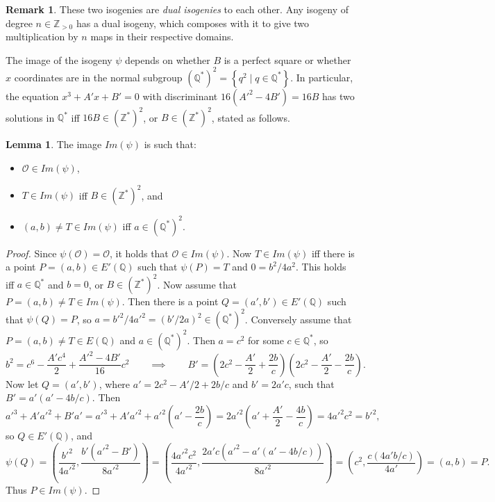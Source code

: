\documentclass{article}
\newcommand{\Z}{\mathbb{Z}}
\newcommand{\Q}{\mathbb{Q}}
\newcommand{\rb}[1]{\left( #1 \right)}
\newcommand{\cb}[1]{\left\{ #1 \right\}}
\theoremstyle{definition}
\newtheorem*{remark}{Remark}
\newtheorem{lemma}[proposition]{Lemma}
\begin{document}
\begin{remark}
These two isogenies are \emph{dual isogenies} to each other. Any isogeny of degree $ n \in \Z_{> 0} $ has a dual isogeny, which composes with it to give two multiplication by $ n $ maps in their respective domains.
\end{remark}

\pagebreak

The image of the isogeny $ \psi $ depends on whether $ B $ is a perfect square or whether $ x $ coordinates are in the normal subgroup $ \rb{\Q^*}^2 = \cb{q^2 \mid q \in \Q^*} $. In particular, the equation $ x^3 + A'x + B' = 0 $ with discriminant $ 16\rb{A'^2 - 4B'} = 16B $ has two solutions in $ \Q^* $ iff $ 16B \in \rb{\Z^*}^2 $, or $ B \in \rb{\Z^*}^2 $, stated as follows.

\begin{lemma}
The image $ Im\rb{\psi} $ is such that:
\begin{itemize}
\item $ \mathcal{O} \in Im\rb{\psi} $,
\item $ T \in Im\rb{\psi} $ iff $ B \in \rb{\Z^*}^2 $, and
\item $ \rb{a, b} \ne T \in Im\rb{\psi} $ iff $ a \in \rb{\Q^*}^2 $.
\end{itemize}
\end{lemma}

\begin{proof}
Since $ \psi\rb{\mathcal{O}} = \mathcal{O} $, it holds that $ \mathcal{O} \in Im\rb{\psi} $. Now $ T \in Im\rb{\psi} $ iff there is a point $ P = \rb{a, b} \in E'\rb{\Q} $ such that $ \psi\rb{P} = T $ and $ 0 = b^2 / 4a^2 $. This holds iff $ a \in \Q^* $ and $ b = 0 $, or $ B \in \rb{\Z^*}^2 $. Now assume that $ P = \rb{a, b} \ne T \in Im\rb{\psi} $. Then there is a point $ Q = \rb{a', b'} \in E'\rb{\Q} $ such that $ \psi\rb{Q} = P $, so $ a = b'^2 / 4a'^2 = \rb{b' / 2a}^2 \in \rb{\Q^*}^2 $. Conversely assume that $ P = \rb{a, b} \ne T \in E\rb{\Q} $ and $ a \in \rb{\Q^*}^2 $. Then $ a = c^2 $ for some $ c \in \Q^* $, so
$$ b^2 = c^6 - \dfrac{A'c^4}{2} + \dfrac{A'^2 - 4B'}{16}c^2 \qquad \implies \qquad B' = \rb{2c^2 - \dfrac{A'}{2} + \dfrac{2b}{c}}\rb{2c^2 - \dfrac{A'}{2} - \dfrac{2b}{c}}. $$
Now let $ Q = \rb{a', b'} $, where $ a' = 2c^2 - A' / 2 + 2b / c $ and $ b' = 2a'c $, such that $ B' = a'\rb{a' - 4b / c} $. Then
$$ a'^3 + A'a'^2 + B'a' = a'^3 + A'a'^2 + a'^2\rb{a' - \dfrac{2b}{c}} = 2a'^2\rb{a' + \dfrac{A'}{2} - \dfrac{4b}{c}} = 4a'^2c^2 = b'^2, $$
so $ Q \in E'\rb{\Q} $, and
$$ \psi\rb{Q} = \rb{\dfrac{b'^2}{4a'^2}, \dfrac{b'\rb{a'^2 - B'}}{8a'^2}} = \rb{\dfrac{4a'^2c^2}{4a'^2}, \dfrac{2a'c\rb{a'^2 - a'\rb{a' - 4b / c}}}{8a'^2}} = \rb{c^2, \dfrac{c\rb{4a'b / c}}{4a'}} = \rb{a, b} = P. $$
Thus $ P \in Im\rb{\psi} $.
\end{proof}
\end{document}
